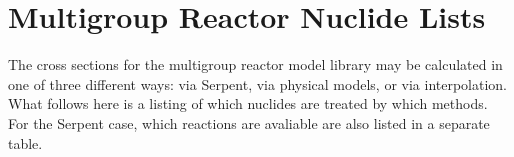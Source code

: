 \chapter{Multigroup Reactor Nuclide Lists}
\label{appendix_rmg_nuclide_lists}

The cross sections for the multigroup reactor model library may be calculated in one of three different ways: 
via Serpent, via physical models, or via interpolation.  What follows here is a listing of which nuclides
are treated by which methods.  For the Serpent case, which reactions are avaliable are also listed in a 
separate table.

\vspace{1em}










